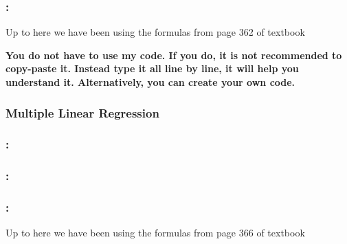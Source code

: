 \documentclass[xcolor=dvipsnames,11pt]{beamer}
\begin{document}
\begin{frame}
	
	\frametitle{\subsecname: \subsubsecname}
	
	\vspace{-3pt}	
	

\begin{block}{}
Up to here we have been using the formulas from page 362 of textbook
\end{block}

\begin{alertblock}{}
	\textbf{You do not have to use my code. If you do, it is not recommended to copy-paste it. Instead type it all line by line, it will help you understand it. Alternatively, you can create your own code.}
\end{alertblock}
	
\end{frame}

\subsubsection{Multiple Linear Regression}

\begin{frame}
	
	\frametitle{\subsecname: \subsubsecname}
	
	\vspace{-3pt}	
	
	
\end{frame}

\begin{frame}
	
	\frametitle{\subsecname: \subsubsecname}
	
	\vspace{-3pt}	
	
	
\end{frame}

\begin{frame}
	
	\frametitle{\subsecname: \subsubsecname}
	
	\vspace{-3pt}	
	

\begin{block}{}
Up to here we have been using the formulas from page 366 of textbook
\end{block}
	
\end{frame}
	
\end{document}
